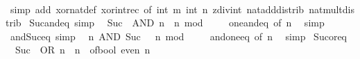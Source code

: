 \begin{isabellebody}
%
\isadelimproof
\ \ %
\endisadelimproof
%
\isatagproof
{}\isamarkupfalse%
\ {\isacharparenleft}{\kern0pt}simp\ add{\isacharcolon}{\kern0pt}\ xor{\isacharunderscore}{\kern0pt}nat{\isacharunderscore}{\kern0pt}def\ xor{\isacharunderscore}{\kern0pt}int{\isacharunderscore}{\kern0pt}rec\ {\isacharbrackleft}{\kern0pt}of\ {\isacartoucheopen}int\ m{\isacartoucheclose}\ {\isacartoucheopen}int\ n{\isacartoucheclose}{\isacharbrackright}{\kern0pt}\ zdiv{\isacharunderscore}{\kern0pt}int\ nat{\isacharunderscore}{\kern0pt}add{\isacharunderscore}{\kern0pt}distrib\ nat{\isacharunderscore}{\kern0pt}mult{\isacharunderscore}{\kern0pt}distrib{\isacharparenright}{\kern0pt}%
\endisatagproof
{\isafoldproof}%
%
\isadelimproof
\isanewline
%
\endisadelimproof
\isanewline
{}\isamarkupfalse%
\ Suc{\isacharunderscore}{\kern0pt}{}{\isacharunderscore}{\kern0pt}and{\isacharunderscore}{\kern0pt}eq\ {\isacharbrackleft}{\kern0pt}simp{\isacharbrackright}{\kern0pt}{\isacharcolon}{\kern0pt}\isanewline
\ \ {\isacartoucheopen}Suc\ {}\ AND\ n\ {\isacharequal}{\kern0pt}\ n\ mod\ {}{\isacartoucheclose}\isanewline
%
\isadelimproof
\ \ %
\endisadelimproof
%
\isatagproof
{}\isamarkupfalse%
\ one{\isacharunderscore}{\kern0pt}and{\isacharunderscore}{\kern0pt}eq\ {\isacharbrackleft}{\kern0pt}of\ n{\isacharbrackright}{\kern0pt}\ \isamarkupfalse%
\ simp%
\endisatagproof
{\isafoldproof}%
%
\isadelimproof
\isanewline
%
\endisadelimproof
\isanewline
{}\isamarkupfalse%
\ and{\isacharunderscore}{\kern0pt}Suc{\isacharunderscore}{\kern0pt}{}{\isacharunderscore}{\kern0pt}eq\ {\isacharbrackleft}{\kern0pt}simp{\isacharbrackright}{\kern0pt}{\isacharcolon}{\kern0pt}\isanewline
\ \ {\isacartoucheopen}n\ AND\ Suc\ {}\ {\isacharequal}{\kern0pt}\ n\ mod\ {}{\isacartoucheclose}\isanewline
%
\isadelimproof
\ \ %
\endisadelimproof
%
\isatagproof
{}\isamarkupfalse%
\ and{\isacharunderscore}{\kern0pt}one{\isacharunderscore}{\kern0pt}eq\ {\isacharbrackleft}{\kern0pt}of\ n{\isacharbrackright}{\kern0pt}\ \isamarkupfalse%
\ simp%
\endisatagproof
{\isafoldproof}%
%
\isadelimproof
\isanewline
%
\endisadelimproof
\isanewline
{}\isamarkupfalse%
\ Suc{\isacharunderscore}{\kern0pt}{}{\isacharunderscore}{\kern0pt}or{\isacharunderscore}{\kern0pt}eq{\isacharcolon}{\kern0pt}\isanewline
\ \ {\isacartoucheopen}Suc\ {}\ OR\ n\ {\isacharequal}{\kern0pt}\ n\ {\isacharplus}{\kern0pt}\ of{\isacharunderscore}{\kern0pt}bool\ {\isacharparenleft}{\kern0pt}even\ n{\isacharparenright}{\kern0pt}{\isacartoucheclose}\isanewline

\end{isabellebody}
